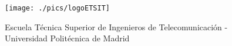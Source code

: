 \usepackage{graphicx}

\begin{figure}
  \centering
    \texttt{[image: ./pics/logoETSIT]}
  \caption[ETSIT-UPM]{Escuela Técnica Superior de Ingenieros de Telecomunicación - Universidad Politécnica de Madrid}
  \label{fig:logoETSIT}
\end{figure}
